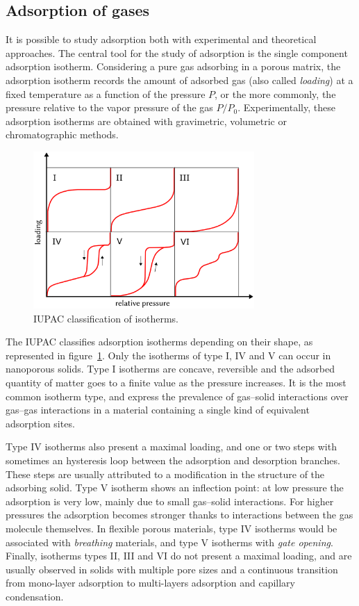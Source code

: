 \documentclass[thesis]{subfiles}
\begin{document}
\subsection{Adsorption of gases}

It is possible to study adsorption both with experimental and theoretical
approaches. The central tool for the study of adsorption is the single component
adsorption isotherm. Considering a pure gas adsorbing in a porous matrix, the
adsorption isotherm records the amount of adsorbed gas (also called
\emph{loading}) at a fixed temperature as a function of the pressure $P$, or the
more commonly, the pressure relative to the vapor pressure of the gas $P/P_0$.
Experimentally, these adsorption isotherms are obtained with gravimetric,
volumetric or chromatographic methods\cite{Ruthven1984, Yang1987}.

\begin{figure}[htb]
    \centering
    \includegraphics[width=0.75\textwidth]{figures/images/iupac-isotherms}
    \caption{IUPAC classification of isotherms.}
    \label{fig:iupac-isotherms}
\end{figure}

The IUPAC classifies adsorption isotherms depending on their shape, as
represented in figure~\ref{fig:iupac-isotherms}\cite{Sing1985}. Only the
isotherms of type I, IV and V can occur in nanoporous solids. Type I isotherms
are concave, reversible and the adsorbed quantity of matter goes to a finite
value as the pressure increases. It is the most common isotherm type, and
express the prevalence of gas--solid interactions over gas--gas interactions in
a material containing a single kind of equivalent adsorption sites.

Type IV isotherms also present a maximal loading, and one or two steps with
sometimes an hysteresis loop between the adsorption and desorption branches.
These steps are usually attributed to a modification in the structure of the
adsorbing solid\cite{Karge1989}. Type V isotherm shows an inflection point: at
low pressure the adsorption is very low, mainly due to small gas--solid
interactions. For higher pressures the adsorption becomes stronger thanks to
interactions between the gas molecule themselves. In flexible porous materials,
type IV isotherms would be associated with \emph{breathing} materials, and type
V isotherms with \emph{gate opening}. Finally, isotherms types II, III and VI do
not present a maximal loading, and are usually observed in solids with multiple
pore sizes and a continuous transition from mono-layer adsorption to
multi-layers adsorption and capillary condensation.
\end{document}
